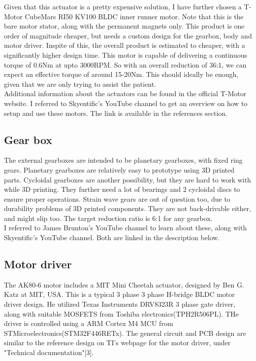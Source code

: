 \documentclass[a4paper]{article}
\begin{document}
			Given that this actuator is a pretty expensive solution, I have further chosen a T-Motor CubeMars RI50 KV100 BLDC inner runner motor. Note that this is the bare motor stator, along with the permanent magnets only. This product is one order of magnitude cheaper, but needs a custom design for the gearbox, body and motor driver. Inspite of this, the overall product is estimated to cheaper, with a significantly higher design time. This motor is capable of delivering a continuous torque of 0.6Nm at upto 3000RPM. So with an overall reduction of 36:1, we can expect an effective torque of around 15-20Nm. This should ideally be enough, given that we are only trying to assist the patient.\\

			Additional information about the actuators can be found in the official T-Motor website. I referred to Skyentific's YouTube channel to get an overview on how to setup and use these motors. The link is available in the references section.

		\subsection{Gear box}
			The external gearboxes are intended to be planetary gearboxes, with fixed ring gears. Planetary gearboxes are relatively easy to prototype using 3D printed parts. Cycloidal gearboxes are another possibility, but they are hard to work with while 3D printing. They further need a lot of bearings and 2 cycloidal discs to ensure proper operations. Strain wave gears are out of question too, due to durability problems of 3D printed components. They are not back-drivable either, and might slip too. The target reduction ratio is 6:1 for any gearbox.\\

			I referred to James Brunton's YouTube channel to learn about these, along with Skyentific's YouTube channel. Both are linked in the description below.

		\subsection{Motor driver}
			The AK80-6 motor includes a MIT Mini Cheetah actuator, designed by Ben G. Katz at MIT, USA. This is a typical 3 phase 3 phase H-bridge BLDC motor driver design. He utilized Texas Instruments DRV8323R 3 phase gate driver, along with suitable MOSFETS from Toshiba electronics(TPH2R506PL). THe driver is controlled using a ARM Cortex M4 MCU from STMicroelectronics(STM32F446RETx). The general circuit and PCB design are similar to the reference design on TI's webpage for the motor driver, under "Technical documentation"[3].\\
\end{document}
